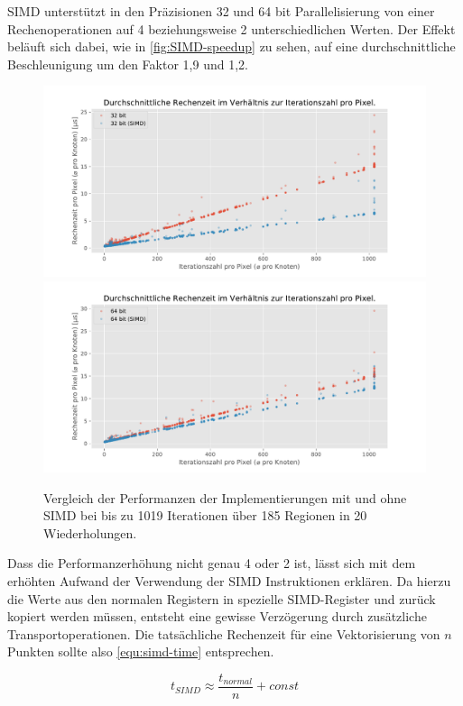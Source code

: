 


SIMD unterstützt in den Präzisionen 32 und 64 bit Parallelisierung von einer Rechenoperationen auf
4 beziehungsweise 2 unterschiedlichen Werten. Der Effekt beläuft sich dabei, wie in \autoref{fig:SIMD-speedup} zu sehen,
auf eine durchschnittliche Beschleunigung um den Faktor 1,9 und 1,2.

\begin{figure}
	\centering
	\includegraphics[width=0.45\linewidth]{img/Evaluation/simd/itvscmp32.pdf}
	\includegraphics[width=0.45\linewidth]{img/Evaluation/simd/itvscmp64.pdf}
	\caption{Vergleich der Performanzen der Implementierungen mit und ohne SIMD bei bis zu 1019 Iterationen über 185 Regionen in 20 Wiederholungen.}
	\label{fig:SIMD-speedup}
\end{figure}

Dass die Performanzerhöhung nicht genau 4 oder 2 ist, lässt sich mit dem erhöhten Aufwand der Verwendung
der SIMD Instruktionen erklären.
Da hierzu die Werte aus den normalen Registern in spezielle SIMD-Register und zurück
kopiert werden müssen, entsteht eine gewisse Verzögerung durch zusätzliche Transportoperationen.
Die tatsächliche Rechenzeit für eine Vektorisierung von \(n\) Punkten sollte also \autoref{equ:simd-time} entsprechen.

\begin{equation}\label{equ:simd-time}
	t_{SIMD} \approx \frac{t_{normal}}{n}+ const
\end{equation}

